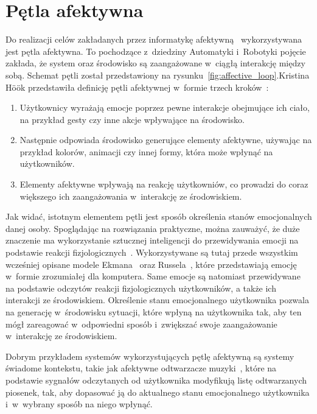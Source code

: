 \section{Pętla afektywna}
Do realizacji celów zakładanych przez informatykę afektywną~\cite{Picard:1997:AC:265013} wykorzystywana jest pętla afektywna. To pochodzące z~dziedziny Automatyki i~Robotyki pojęcie zakłada, że system oraz środowisko są zaangażowane w~ciągłą interakcję między sobą. Schemat pętli został przedstawiony na rysunku~\ref{fig:affective_loop}.\newpage Kristina Höök przedstawiła definicję pętli afektywnej w~formie trzech kroków~\cite{affective_loop_experiences}:
\begin{enumerate}
	\item Użytkownicy wyrażają emocje poprzez pewne  interakcje obejmujące ich ciało, na przykład gesty czy inne akcje wpływające na środowisko.
	\item Następnie odpowiada środowisko generujące elementy afektywne, używając na przykład kolorów, animacji czy innej formy, która może wpłynąć na użytkowników.
	\item Elementy afektywne wpływają na reakcję użytkowniów, co prowadzi do coraz większego ich zaangażowania w~interakcję ze środowiskiem.
\end{enumerate}

Jak widać, istotnym elementem pętli jest sposób określenia stanów emocjonalnych danej osoby. Spoglądając na rozwiązania praktyczne, można zauważyć, że duże znaczenie ma wykorzystanie sztucznej inteligencji do przewidywania emocji na podstawie reakcji fizjologicznych~\cite{emotional_context_geist_2019}. Wykorzystywane są tutaj przede wszystkim wcześniej opisane modele Ekmana~\cite{Ekman1971ConstantsAC} oraz Russela~\cite{circumplex_model_russel_1980}, które przedstawiają emocję w~formie zrozumiałej dla komputera. Same emocje są natomiast przewidywane na podstawie odczytów reakcji fizjologicznych użytkowników, a także ich interakcji ze środowiskiem. Określenie stanu emocjonalnego użytkownika pozwala na generację w~środowisku sytuacji, które wpłyną na użytkownika tak, aby ten mógł zareagować w~odpowiedni sposób i~zwiększać swoje zaangażowanie w~interakcję ze środowiskiem. 

Dobrym przykładem systemów wykorzystujących pętlę afektywną są systemy świadome kontekstu, takie jak afektywne odtwarzacze muzyki~\cite{Janssen2012,ChrzanowskaInzynierska}, które na podstawie sygnałów odczytanych od użytkownika modyfikują listę odtwarzanych piosenek, tak, aby dopasować ją do aktualnego stanu emocjonalnego użytkownika i~w~wybrany sposób na niego wpłynąć.

